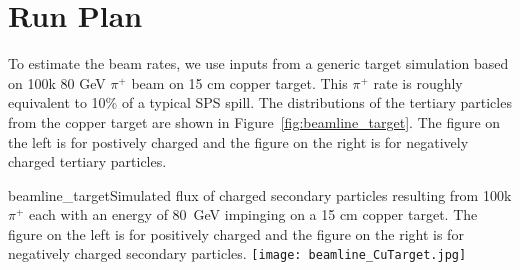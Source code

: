 \section{Run Plan}
\label{sec:runplan}


To estimate the beam rates, we use inputs from a generic target simulation based on 100k 80 GeV $\pi^+$ beam on 15 cm copper target. This $\pi^+$ rate is roughly equivalent to 10\% of a typical SPS spill. The distributions of the tertiary particles from the copper target are shown in Figure~\ref{fig:beamline_target}. The figure on the left is for postively charged and the figure on the right is for negatively charged tertiary particles. 
\begin{cdrfigure}{beamline_target}{Simulated flux of charged secondary particles resulting from 100k $\pi^+$ each with an energy of 80~GeV impinging on a 15 cm copper target. The figure on the left is for positively charged and the figure on the right is for negatively charged secondary particles.}
\texttt{[image: beamline\_CuTarget.jpg]}
\end{cdrfigure}

